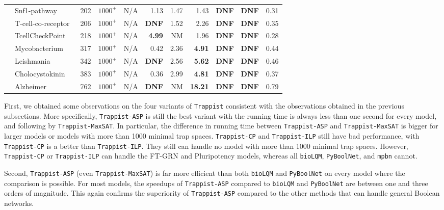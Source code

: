 \documentclass[preprint,12pt]{elsarticle}
\newcounter{rownumber}
\newcommand\rownb{\stepcounter{rownumber}\arabic{rownumber}}
\begin{document}
\begin{table}[!htb]
{\begin{tabular}{rlrrrrrrrrr}
    \midrule %
    \rownb & Snf1-pathway~\cite{Lubitz2015} & 202 & $1000^+$ & N/A & 1.13 & 1.47 & 1.43 & \textbf{DNF} & \textbf{DNF} & 0.31 \\
    \rownb & T-cell-co-receptor~\cite{DesignPrinciplesGeneNetworks} & 206 & $1000^+$ & N/A & \textbf{DNF} & 1.52 & 2.26 & \textbf{DNF} & \textbf{DNF} & 0.35 \\
    \rownb & TcellCheckPoint~\cite{hernandez2020computational} & 218 & $1000^+$ & N/A & \textbf{4.99} & NM & 1.96 & \textbf{DNF} & \textbf{DNF} & 0.28 \\
    \rownb & Mycobacterium~\cite{DesignPrinciplesGeneNetworks} & 317 & $1000^+$ & N/A & 0.42 & 2.36 & \textbf{4.91} & \textbf{DNF} & \textbf{DNF} & 0.44 \\
    \rownb & Leishmania~\cite{DesignPrinciplesGeneNetworks} & 342 & $1000^+$ & N/A & \textbf{DNF} & 2.56 & \textbf{5.62} & \textbf{DNF} & \textbf{DNF} & 0.46 \\
    \rownb & Cholocystokinin~\cite{aghamiri2020automated} & 383 & $1000^+$ & N/A & 0.36 & 2.99 & \textbf{4.81} & \textbf{DNF} & \textbf{DNF} & 0.37 \\
    \rownb & Alzheimer~\cite{aghamiri2020automated} & 762 & $1000^+$ & N/A & \textbf{DNF} & NM & \textbf{18.21} & \textbf{DNF} & \textbf{DNF} & 0.79 \\

    \bottomrule
  \end{tabular}
  }
\end{table}

First, we obtained some observations on the four variants of \texttt{Trappist} consistent with the observations obtained in the previous subsections.
More specifically, \texttt{Trappist-ASP} is still the best variant with the running time is always less than one second for every model, and following by \texttt{Trappist-MaxSAT}.
In particular, the difference in running time between \texttt{Trappist-ASP} and \texttt{Trappist-MaxSAT} is bigger for larger models or models with more than 1000 minimal trap spaces.
\texttt{Trappist-CP} and \texttt{Trappist-ILP} still have bad performance, with \texttt{Trappist-CP} is a better than \texttt{Trappist-ILP}.
They still can handle no model with more than 1000 minimal trap spaces.
However, \texttt{Trappist-CP} or \texttt{Trappist-ILP} can handle the FT-GRN and Pluripotency models, whereas all \texttt{bioLQM}, \texttt{PyBoolNet}, and \texttt{mpbn} cannot.

Second, \texttt{Trappist-ASP} (even \texttt{Trappist-MaxSAT}) is far more efficient than both \texttt{bioLQM} and \texttt{PyBoolNet} on every model where the comparison is possible.
For most models, the speedups of \texttt{Trappist-ASP} compared to \texttt{bioLQM} and \texttt{PyBoolNet} are between one and three orders of magnitude.
This again confirms the superiority of \texttt{Trappist-ASP} compared to the other methods that can handle general Boolean networks.
\end{document}
